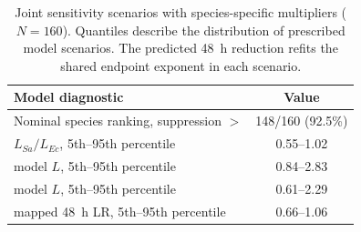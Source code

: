 \begin{table}[htbp]\centering\small
\caption{Joint sensitivity scenarios with species-specific multipliers ($N=160$). Quantiles describe the distribution of prescribed model scenarios. The predicted \Pa{} 48~h reduction refits the shared endpoint exponent in each scenario.}
\label{tab:independent}
\begin{tabular}{lc}\toprule
Model diagnostic & Value\\\midrule
Nominal species ranking, \Ec{} suppression $>$ \Sa{} & 148/160 (92.5\%)\\
$L_{Sa}/L_{Ec}$, 5th--95th percentile & 0.55--1.02\\
\Ec{} model $L$, 5th--95th percentile & 0.84--2.83\\
\Sa{} model $L$, 5th--95th percentile & 0.61--2.29\\
\Pa{} mapped 48~h LR, 5th--95th percentile & 0.66--1.06\\
\bottomrule\end{tabular}
\end{table}
